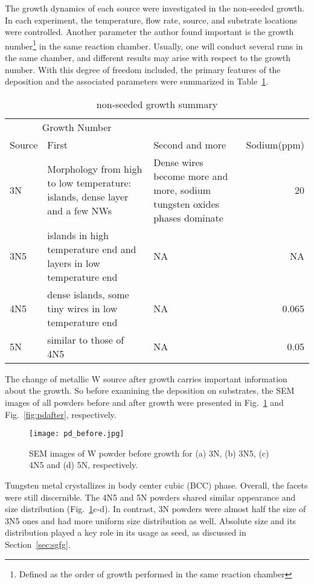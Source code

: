 The growth dynamics of each source were investigated in the non-seeded growth. In each experiment, the temperature, flow rate, source, and substrate locations were controlled. Another parameter the author found important is the growth number\footnote{Defined as the order of growth performed in the same reaction chamber} in the same reaction chamber. Usually, one will conduct several runs in the same chamber, and different results may arise with respect to the growth number. With this degree of freedom included, the primary features of the deposition and the associated parameters were summarized in Table~\ref{tab:wot}.
\begin{table}[htb]
\centering
\caption{ non-seeded growth summary}\label{tab:wot}
\begin{tabular}{lp{2in}p{2in}r}
\toprule
\multicolumn{2}{c}{Growth Number} \\
\cmidrule(l){2-3}
 Source   & First & Second and more & Sodium(ppm)   \\
\midrule
3N      & Morphology from high to low temperature: islands, dense layer and a few NWs & Dense wires become more and more, sodium tungsten oxides phases dominate & 20  \\
3N5     & islands in high temperature end and layers in low temperature end & NA &      NA\\
4N5     & dense islands, some tiny wires in low temperature end & NA & 0.065 \\
5N      & similar to those of 4N5  & NA & 0.05\\
\bottomrule
\end{tabular}
\end{table}
The change of metallic W source after growth carries important information about the growth. So before examining the deposition on substrates, the SEM images of all powders before and after growth were presented in Fig.~\ref{fig:pdbefore} and Fig.~\ref{fig:pdafter}, respectively.
\begin{figure}[htb]
\centering
\texttt{[image: pd\_before.jpg]}
\caption[SEM images of W powder before growth]{SEM images of W powder before growth for (a) 3N, (b) 3N5, (c) 4N5 and (d) 5N, respectively.}
\label{fig:pdbefore}
\end{figure}
Tungsten metal crystallizes in body center cubic (BCC) phase. Overall, the facets were still discernible. The 4N5 and 5N powders shared similar appearance and size distribution (Fig.~\ref{fig:pdbefore}c-d). In contrast, 3N powders were almost half the size of 3N5 ones and had more uniform size distribution as well. Absolute size and its distribution played a key role in its usage as seed, as discussed in Section~\ref{sec:sgfg}.
